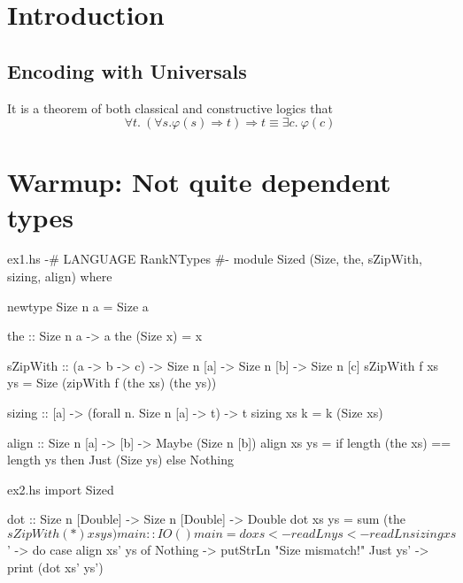 \documentclass[format=sigplan, review=false, screen=true]{acmart}
\begin{document}
\renewcommand{\shortauthors}{M. Noonan}

%

\section{Introduction}

\subsection{Encoding with Universals}

It is a theorem of both classical and constructive logics that
\[\forall t.~ (\forall s. \varphi(s) \Rightarrow t) \Rightarrow t \equiv \exists c.~ \varphi(c)\]

\section{Warmup: Not quite dependent types}

\begin{filecontents*}{ex1.hs}  
{-# LANGUAGE RankNTypes #-}
module Sized
  (Size, the, sZipWith, sizing, align) where

newtype Size n a = Size a

the :: Size n a -> a
the (Size x) = x

sZipWith :: (a -> b -> c)
         -> Size n [a]
         -> Size n [b]
         -> Size n [c]
sZipWith f xs ys =
  Size (zipWith f (the xs) (the ys))
  
sizing :: [a] -> (forall n. Size n [a] -> t) -> t
sizing xs k = k (Size xs)

align :: Size n [a] -> [b] -> Maybe (Size n [b])
align xs ys = if length (the xs) == length ys
              then Just (Size ys)
              else Nothing

\end{filecontents*}

\begin{filecontents*}{ex2.hs}
import Sized

dot :: Size n [Double] -> Size n [Double] -> Double
dot xs ys = sum (the $ sZipWith (*) xs ys)

main :: IO ()
main = do
  xs <- readLn
  ys <- readLn
  sizing xs $ \xs' -> do
    case align xs' ys of
      Nothing  -> putStrLn "Size mismatch!"
      Just ys' -> print (dot xs' ys')
\end{filecontents*}
\end{document}

